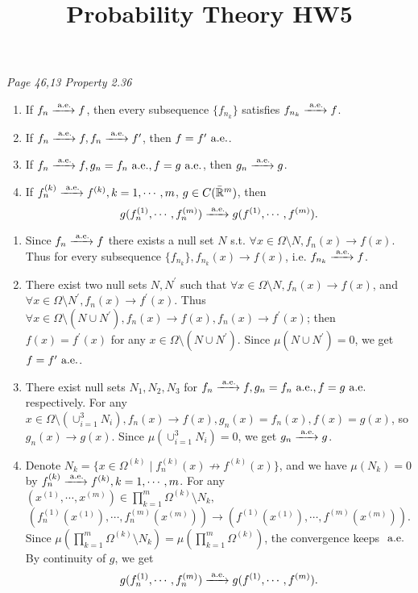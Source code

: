 


\title{Probability Theory HW5}
\author{\asemail}
\maketitle

\begin{enumerate}
	\isep[1em]

\prob
\textit{Page 46,13 Property 2.36}%
\begin{enumerate}
	\item If $f_n \xrightarrow{\textrm{ a.e.}} f$, then every subsequence $\{f_{n_k}\}$ satisfies $f_{n_k} \xrightarrow{\textrm{ a.e.}} f$.
	\item If $f_n \xrightarrow{\textrm{ a.e.}} f, f_n \xrightarrow{\textrm{ a.e.}} f^\prime$, then $f=f^\prime \textrm{ a.e.}$.
	\item If $f_n \xrightarrow{\textrm{ a.e.}} f, g_n=f_n \textrm{ a.e.}, f=g \textrm{ a.e.}$, then $g_n \xrightarrow{\textrm{ a.e.}} g$.
	\item If $f_n^{(k)} \xrightarrow{\textrm{ a.e.}} f^{(k)},k=1,\cdots,m$, $g\in C(\bar{\mathbb{R}}^m)$, then $$
	g(f_n^{(1)},\cdots,f_n^{(m)})\xrightarrow{\textrm{ a.e.}} g(f^{(1)},\cdots,f^{(m)}).$$
\end{enumerate}
\soln
\begin{enumerate}
	\item Since $f_n \xrightarrow{\textrm{ a.e.}} f$ there exists a null set $N$ s.t. $\forall x\in \Omega\setminus N, f_n(x)\to f(x)$. 
	Thus for every subsequence $\{f_{n_k}\}, f_{n_k}(x)\to f(x)$, i.e. $f_{n_k} \xrightarrow{\textrm{ a.e.}} f$.
	\item There exist two null sets $N,N^\prime$ such that 
	$\forall x\in \Omega\setminus N, f_n(x)\to f(x)$, and 
	\\ $\forall x\in \Omega\setminus N^\prime, f_n(x)\to f^\prime(x)$. 
	Thus $\forall x\in \Omega\setminus (N\cup N^\prime), f_n(x)\to f(x), f_n(x)\to f^\prime(x)$; then $f(x)= f^\prime(x)$ for any $x\in \Omega\setminus (N\cup N^\prime)$. 
	Since $\mu(N\cup N^\prime)=0$, we get $f=f^\prime \textrm{ a.e.}$.
	\item There exist null sets $N_1,N_2,N_3$ for $f_n \xrightarrow{\textrm{ a.e.}} f, g_n=f_n \textrm{ a.e.}, f=g \textrm{ a.e.}$ respectively. 
	For any $x\in \Omega\setminus (\cup_{i=1}^3 N_i), f_n(x) \to f(x), g_n(x)=f_n(x) , f(x)=g(x)$, so $g_n(x) \to g(x)$. 
	Since $\mu(\cup_{i=1}^3 N_i)=0$, we get $g_n \xrightarrow{\textrm{ a.e.}} g$.
	\item Denote $N_k=\{x\in \Omega^{(k)} \mid f_n^{(k)}(x) \not\to f^{(k)}(x) \} $, and we have $\mu(N_k)=0$ by $f_n^{(k)} \xrightarrow{\textrm{ a.e.}} f^{(k)},k=1,\cdots,m$.
	For any $(x^{(1)},\cdots,x^{(m)})\in \prod_{k=1}^m \Omega^{(k)}\setminus N_k,$ 
	$$\left(f_n^{(1)} (x^{(1)} ), \cdots, f_n^{(m)} (x^{(m)} )\right)\to \left(f^{(1)} (x^{(1)} ), \cdots, f^{(m)} (x^{(m)} )\right).$$
	Since $\mu(\prod_{k=1}^m \Omega^{(k)}\setminus N_k)=\mu(\prod_{k=1}^m \Omega^{(k)})$, the convergence keeps $\textrm{ a.e.}$
	By continuity of $g$, we get $$
	g(f_n^{(1)},\cdots,f_n^{(m)})\xrightarrow{\textrm{ a.e.}} g(f^{(1)},\cdots,f^{(m)}).$$
\end{enumerate}


\end{enumerate}
